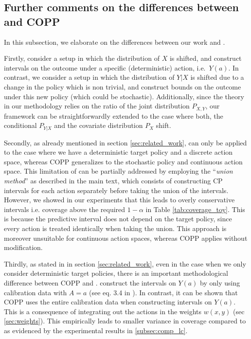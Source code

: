 \subsection{Further comments on the differences between \cite{lei2020conformal} and COPP}\label{sec:comp_lc}
In this subsection, we elaborate on the differences between our work and \cite{lei2020conformal}.


Firstly, \cite{lei2020conformal} consider a setup in which the distribution of $X$ is shifted, and construct intervals on the outcome under a specific (deterministic) action, i.e.\ $Y(a)$. In contrast, we consider a setup in which the distribution of $Y|X$ is shifted due to a change in the policy which is non trivial, and construct bounds on the outcome under this new policy (which could be stochastic). Additionally, since the theory in our methodology relies on the ratio of the joint distribution $P_{X,Y}$, our framework can be straightforwardly extended to the case where both, the conditional $P_{Y|X}$ and the covariate distribution $P_X$ shift.

Secondly, as already mentioned in section \ref{sec:related_work}, \cite{lei2020conformal} can only be applied to the case where we have a deterministic target policy and a discrete action space, whereas COPP generalizes to the stochastic policy and continuous action space. This limitation of \cite{lei2020conformal} can be partially addressed by employing the ``\textit{union method}'' as described in the main text, which consists of constructing CP intervals for each action separately before taking the union of the intervals. However, we showed in our experiments that this leads to overly conservative intervals i.e. coverage above the required $1-\alpha$ in Table \ref{tab:coverage_toy}. This is because the predictive interval does not depend on the target policy, since every action is treated identically when taking the union. This approach is moreover unsuitable for continuous action spaces, whereas COPP applies without modification.

Thirdly, as stated in in section \ref{sec:related_work}, even in the case when we only consider deterministic target policies, there is an important methodological difference between COPP and \cite{lei2020conformal}. \cite{lei2020conformal} construct the intervals on $Y(a)$ by only using calibration data with $A=a$ (see eq. 3.4 in \cite{lei2020conformal}). In contrast, it can be shown that COPP uses the entire calibration data when constructing intervals on $Y(a)$. This is a consequence of integrating out the actions in the weights $w(x, y)$ (sec \ref{sec:weights}). This empirically leads to smaller variance in coverage compared to \cite{lei2020conformal} as evidenced by the experimental results in \ref{subsec:comp_lc}.

